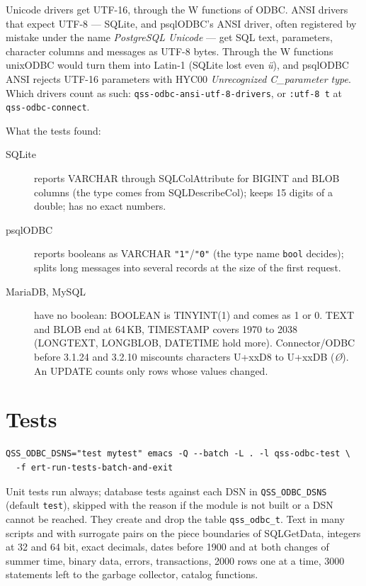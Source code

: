 \documentclass[
  paper=a4, fontsize=11pt, parskip=half, headings=small,
  toc=bibliography, numbers=noenddot, DIV=12
]{scrreprt}
\newcommand{\code}[1]{\texttt{#1}}
\begin{document}
Unicode drivers get UTF-16, through the W functions of ODBC. ANSI drivers that
expect UTF-8 --- SQLite, and psqlODBC's ANSI driver, often registered by
mistake under the name \emph{PostgreSQL Unicode} --- get SQL text,
parameters, character columns and messages as UTF-8 bytes. Through the W
functions unixODBC would turn them into Latin-1 (SQLite lost even
\emph{ü}), and psqlODBC ANSI rejects UTF-16 parameters with HYC00
\emph{Unrecognized C\_parameter type}. Which drivers count as such:
\code{qss-odbc-ansi-utf-8-drivers}, or \code{:utf-8 t} at
\code{qss-odbc-connect}.

What the tests found:

\begin{description}
\item[SQLite] reports VARCHAR through SQLColAttribute for BIGINT and BLOB
  columns (the type comes from SQLDescribeCol); keeps 15 digits of a double;
  has no exact numbers.
\item[psqlODBC] reports booleans as VARCHAR \code{"1"}/\code{"0"} (the type
  name \code{bool} decides); splits long messages into several records at the
  size of the first request.
\item[MariaDB, MySQL] have no boolean: BOOLEAN is TINYINT(1) and comes as 1 or
  0. TEXT and BLOB end at 64\,KB, TIMESTAMP covers 1970 to 2038 (LONGTEXT,
  LONGBLOB, DATETIME hold more). Connector/ODBC before 3.1.24 and 3.2.10
  miscounts characters U+xxD8 to U+xxDB (\emph{Ø}). An UPDATE counts only rows
  whose values changed.
\end{description}

\chapter{Tests}

\begin{Verbatim}
QSS_ODBC_DSNS="test mytest" emacs -Q --batch -L . -l qss-odbc-test \
  -f ert-run-tests-batch-and-exit
\end{Verbatim}

Unit tests run always; database tests against each DSN in
\code{QSS\_ODBC\_DSNS} (default \code{test}), skipped with the reason if the
module is not built or a DSN cannot be reached. They create and drop the
table \code{qss\_odbc\_t}. Text in many scripts and with surrogate pairs on
the piece boundaries of SQLGetData, integers at 32 and 64 bit, exact
decimals, dates before 1900 and at both changes of summer time, binary data,
errors, transactions, 2000 rows one at a time, 3000 statements left to the
garbage collector, catalog functions.
\end{document}
